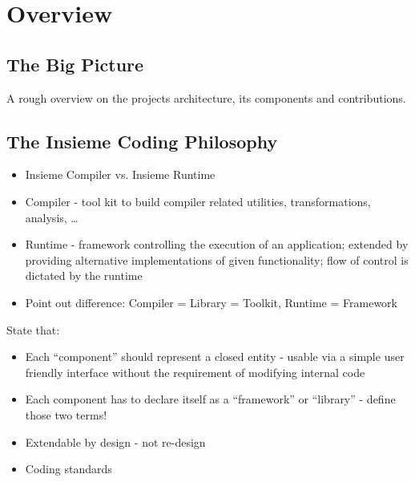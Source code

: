 \chapter{Overview} \label{cap:overview}

\section{The Big Picture}
A rough overview on the projects architecture, its components and contributions.

\section{The Insieme Coding Philosophy}


\begin{itemize}
  \item Insieme Compiler vs. Insieme Runtime
  \item Compiler - tool kit to build compiler related utilities,
  transformations, analysis, \ldots
  \item Runtime - framework controlling the execution of an application;
  extended by providing alternative implementations of given functionality; flow
  of control is dictated by the runtime
  \item Point out difference: Compiler = Library = Toolkit, Runtime = Framework
\end{itemize}


State that:
\begin{itemize}
  \item Each ``component'' should represent a closed entity - usable via a simple
  user friendly interface without the requirement of modifying internal code
  \item Each component has to declare itself as a ``framework'' or ``library'' -
  define those two terms!
  \item Extendable by design - not re-design
  \item Coding standards
\end{itemize}